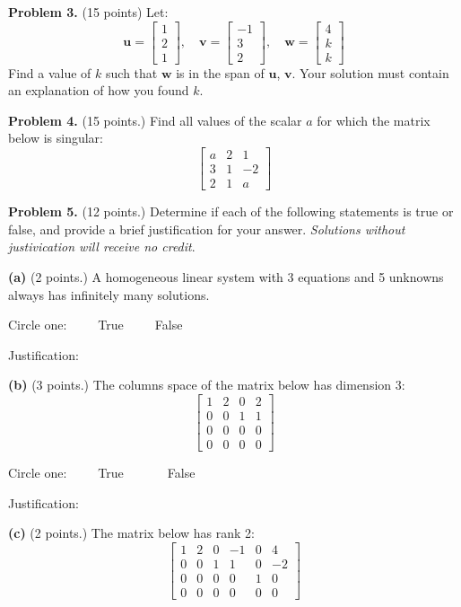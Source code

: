 \documentclass[12pt]{article}
\begin{document}
\clearpage

\textbf{Problem 3.} (15 points) Let:
\[
\mathbf{u}=\begin{bmatrix}1\\2\\1\end{bmatrix},\quad
\mathbf{v}=\begin{bmatrix}-1\\3\\2\end{bmatrix},\quad
\mathbf{w}=\begin{bmatrix}4\\k\\k\end{bmatrix}
\]
Find a value of $k$ such that $\mathbf{w}$ is in the span of $\mathbf{u}$, $\mathbf{v}$. Your solution must contain an explanation of how you found $k$.

\clearpage

\textbf{Problem 4.} (15 points.) Find all values of the scalar $a$ for which the matrix below is singular:
\[
\left[\begin{matrix}a & 2 & 1\\3 & 1 & -2\\2 & 1 & a\end{matrix}\right]
\]

\clearpage

\textbf{Problem 5.} (12 points.) Determine if each of the following statements is true or false, and provide a brief justification for your answer. \emph{Solutions without justivication will receive no credit}.

\textbf{(a)} (2 points.) A homogeneous linear system with 3 equations and 5 unknowns always has infinitely many solutions.

Circle one:\ \ \ \ \  True\ \ \ \ \ False

Justification:
\vfill

\textbf{(b)} (3 points.) The columns space of the matrix below has dimension 3:
\[
\begin{bmatrix}
1 & 2 & 0 & 2\\
0 & 0 & 1 & 1\\
0 & 0 & 0 & 0\\
0 & 0 & 0 & 0
\end{bmatrix}
\]

Circle one:\ \ \ \ \  True\ \ \ \ \ \ \ False

Justification:
\vfill

\textbf{(c)} (2 points.) The matrix below has rank 2:
\[
\left[
\begin{matrix}
1 & 2 & 0 & -1 & 0 & 4\\
0 & 0 & 1 &  1 & 0 & -2\\
0 & 0 & 0 & 0 & 1 & 0 \\
0 & 0 & 0 & 0 & 0 & 0
\end{matrix}
\right]
\]
\end{document}
